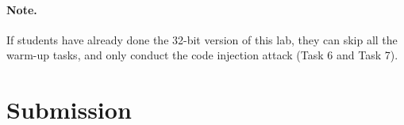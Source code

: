 \paragraph{Note.} If students have already done 
the 32-bit version of this lab, they can skip all the 
warm-up tasks, and only conduct the code injection attack (Task 6
and Task 7). 



\section{Submission}

\seedsubmission




